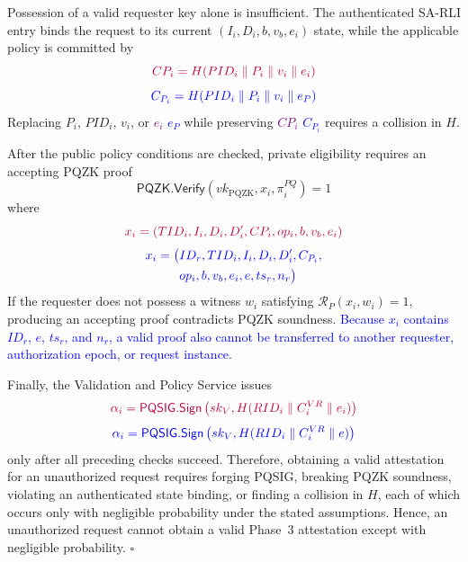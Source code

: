\documentclass[lettersize,journal]{IEEEtran}
\begin{document}
Possession of a valid requester key alone is insufficient. The
authenticated SA-RLI entry binds the request to its current
$(I_i,D_i,b,v_b,e_i)$ state, while the applicable policy is committed
by
\begin{equation}
{\color{purple}CP_i=H(PID_i\parallel P_i\parallel v_i\parallel e_i)}
\end{equation}
\begin{equation}
{\color{blue}C_{P_i}=H(PID_i\parallel P_i\parallel v_i\parallel e_P)}
\label{eq:sec_policy}
\end{equation}
Replacing $P_i$, $PID_i$, $v_i$, or \textcolor{purple}{$e_i$}\textcolor{blue}{ $e_P$} while preserving \textcolor{purple}{$CP_i$}\textcolor{blue}{ $C_{P_i}$}
requires a collision in $H$.

After the public policy conditions are checked, private eligibility
requires an accepting PQZK proof
\begin{equation}
\mathsf{PQZK.Verify}
(vk_{\mathrm{PQZK}},x_i,\pi_i^{PQ})=1
\label{eq:sec_zk_verify}
\end{equation}
where
\begin{equation}
{\color{purple}x_i=(TID_i,I_i,D_i,D_i',CP_i,op_i,b,v_b,e_i)}
\end{equation}
\begin{equation}
{\color{blue}
\begin{aligned}
x_i=\big(&ID_r,TID_i,I_i,D_i,D_i',C_{P_i},\\
&op_i,b,v_b,e_i,e,ts_r,n_r\big)
\end{aligned}}
\label{eq:sec_zk_statement}
\end{equation}
If the requester does not possess a witness $w_i$ satisfying
$\mathcal{R}_{P}(x_i,w_i)=1$, producing an accepting proof contradicts
PQZK soundness. \textcolor{blue}{Because $x_i$ contains $ID_r$, $e$,
$ts_r$, and $n_r$, a valid proof also cannot be transferred to another
requester, authorization epoch, or request instance.}

Finally, the Validation and Policy Service issues
\begin{equation}
{\color{purple}\alpha_i=
\mathsf{PQSIG.Sign}
\left(
sk_V,H(RID_i\parallel C_i^{VR}\parallel e_i)
\right)}
\end{equation}
\begin{equation}
{\color{blue}\alpha_i=
\mathsf{PQSIG.Sign}
\left(
sk_V,H(RID_i\parallel C_i^{VR}\parallel e)
\right)}
\label{eq:sec_validation_att}
\end{equation}
only after all preceding checks succeed. Therefore, obtaining a valid
attestation for an unauthorized request requires forging PQSIG,
breaking PQZK soundness, violating an authenticated state binding, or
finding a collision in $H$, each of which occurs only with negligible
probability under the stated assumptions. Hence, an unauthorized
request cannot obtain a valid Phase~3 attestation except with
negligible probability.
\hfill$\square$
\end{document}
